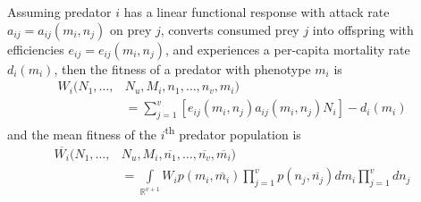 \documentclass{amsart}
\theoremstyle{definition}
\theoremstyle{remark}
\numberwithin{equation}{section}
\begin{document}
Assuming predator $i$ has a linear functional response with attack rate $a_{ij} = a_{ij}(m_i, n_j)$ on prey $j$, converts consumed prey $j$ into offspring with efficiencies $e_{ij} = e_{ij}(m_i, n_j)$, and experiences a per-capita mortality rate $d_i(m_i)$, then the fitness of a predator with phenotype $m_i$ is
\begin{equation}
	\label{predator_fitness}
	\begin{aligned}
		W_i(N_1, \dots, &N_u, M_i, n_1, \dots, n_v, m_i) \\
		&= \sum\limits_{j = 1}^{v}\left[e_{ij}(m_i, n_j)a_{ij}(m_i, n_j)N_i\right] - d_i(m_i)
	\end{aligned}
\end{equation}
and the mean fitness of the $i$\textsuperscript{th} predator population is
\begin{equation}
	\label{avg_predator_fitness}
	\begin{aligned}
		\overline{W_i}(N_1, \dots, &N_u, M_i, \overline{n_1}, \dots, \overline{n_v}, \overline{m_i}) \\
		&= \int\limits_{\mathbb{R}^{v+1}}^{}W_ip(m_i, \overline{m_i})\prod\limits_{j = 1}^{v}p(n_j, \overline{n_j})dm_i\prod\limits_{j = 1}^{v}dn_j
	\end{aligned}
\end{equation}
\end{document}
